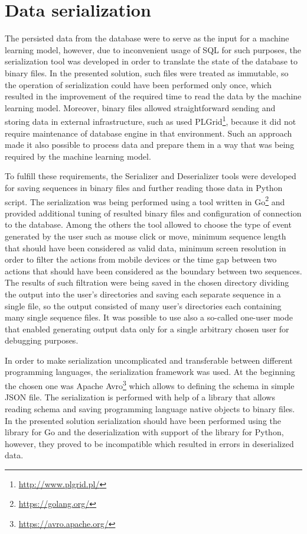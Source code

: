 \section{Data serialization}\label{sec:data-serialization}
The persisted data from the database were to serve as the input for a machine learning model, however, due to inconvenient usage of SQL for such purposes, the serialization tool was developed in order to translate the state of the database to binary files.
In the presented solution, such files were treated as immutable, so the operation of serialization could have been performed only once, which resulted in the improvement of the required time to read the data by the machine learning model.
Moreover, binary files allowed straightforward sending and storing data in external infrastructure, such as used PLGrid\footnote{\url{http://www.plgrid.pl/}}, because it did not require maintenance of database engine in that environment.
Such an approach made it also possible to process data and prepare them in a way that was being required by the machine learning model.

To fulfill these requirements, the Serializer and Deserializer tools were developed for saving sequences in binary files and further reading those data in Python script.
The serialization was being performed using a tool written in Go\footnote{\url{https://golang.org/}} and provided additional tuning of resulted binary files and configuration of connection to the database.
Among the others the tool allowed to choose the type of event generated by the user such as mouse click or move, minimum sequence length that should have been considered as valid data, minimum screen resolution in order to filter the actions from mobile devices or the time gap between two actions that should have been considered as the boundary between two sequences.
The results of such filtration were being saved in the chosen directory dividing the output into the user's directories and saving each separate sequence in a single file, so the output consisted of many user's directories each containing many single sequence files.
It was possible to use also a so-called one-user mode that enabled generating output data only for a single arbitrary chosen user for debugging purposes.

In order to make serialization uncomplicated and transferable between different programming languages, the serialization framework was used.
At the beginning the chosen one was Apache Avro\footnote{\url{https://avro.apache.org/}} which allows to defining the schema in simple JSON file.
The serialization is performed with help of a library that allows reading schema and saving programming language native objects to binary files.
In the presented solution serialization should have been performed using the library for Go and the deserialization with support of the library for Python, however, they proved to be incompatible which resulted in errors in deserialized data.

